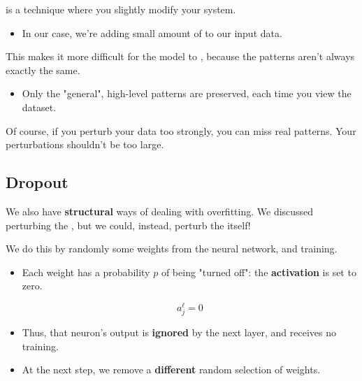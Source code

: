             \begin{definition}
                 is a technique where you slightly modify your system.

                \begin{itemize}
                    \item In our case, we're  adding small amount of  to our input data.
                \end{itemize}

                This makes it more difficult for the model to , because the patterns aren't always exactly the same.

                \begin{itemize}
                    \item Only the "general", high-level patterns are preserved, each time you view the dataset.
                \end{itemize}
            \end{definition}

            Of course, if you perturb your data too strongly, you can miss real patterns. Your perturbations shouldn't be too large.

            

    \subsection{Dropout}

        We also have \textbf{structural} ways of dealing with overfitting. We discussed perturbing the , but we could, instead, perturb the  itself!

        

        We do this by randomly  some weights from the neural network, and training. 

        \begin{itemize}
            \item Each weight has a probability $p$ of being "turned off": the \textbf{activation} is set to zero.

            \begin{equation}
                a^\ell_j=0
            \end{equation}

            \item Thus, that neuron's output is \textbf{ignored} by the next layer, and receives no training.

            \item At the next step, we remove a \textbf{different} random selection of weights. 
        \end{itemize}

